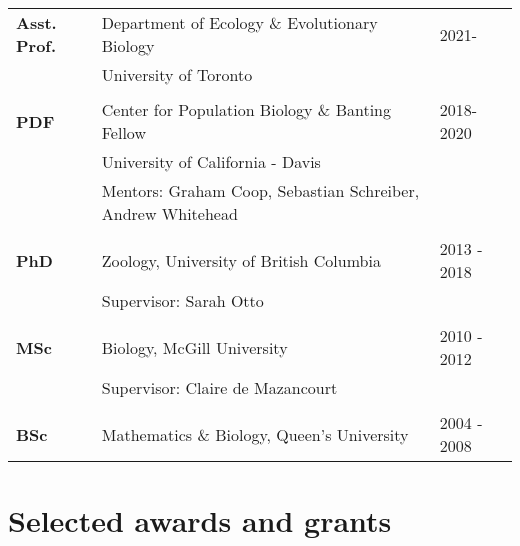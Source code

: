 \documentclass[12pt]{article}
\begin{document}
\begin{tabular}{lll}
\textbf{Asst. Prof.} & Department of Ecology \& Evolutionary Biology & 2021-\\
& University of Toronto \\
\\
\textbf{PDF} & Center for Population Biology \& Banting Fellow & 2018-2020\\
& University of California -  Davis \\
& Mentors: Graham Coop, Sebastian Schreiber, Andrew Whitehead\\
\\


\textbf{PhD} & Zoology, University of British Columbia & 2013 - 2018\\
& Supervisor: Sarah Otto\\
\\
\textbf{MSc} & Biology, McGill University & 2010 - 2012 \\
& Supervisor: Claire de Mazancourt\\
\\
\textbf{BSc} &  Mathematics \& Biology, Queen's University & 2004 - 2008\\ %
\end{tabular}

\section*{Selected awards and grants}
\end{document}
